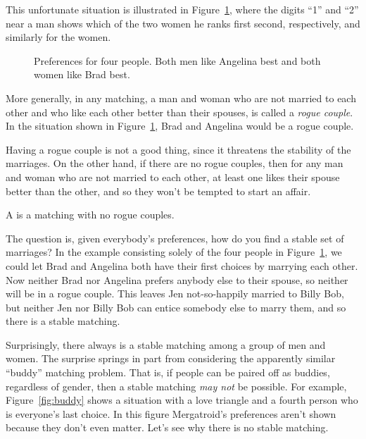 This unfortunate situation is illustrated in
Figure~\ref{fig:minWtMatch2}, where the digits ``1'' and ``2'' near a
man shows which of the two women he ranks first second, respectively,
and similarly for the women.

\begin{figure}


\caption{Preferences for four people.  Both men like Angelina best and
both women like Brad best.}
\label{fig:minWtMatch2}
\end{figure}

More generally, in any matching, a man and woman who are not married
to each other and who like each other better than their spouses, is
called a \emph{rogue couple}.  In the situation shown in
Figure~\ref{fig:minWtMatch2}, Brad and Angelina would be a rogue
couple.

Having a rogue couple is not a good thing, since it threatens the
stability of the marriages.  On the other hand, if there are no rogue
couples, then for any man and woman who are not married to each other,
at least one likes their spouse better than the other, and so they
won't be tempted to start an affair.

\begin{definition}
  A  is a matching with no rogue couples.
\end{definition}

The question is, given everybody's preferences, how do you find a
stable set of marriages?  In the example consisting solely of the four
people in Figure~\ref{fig:minWtMatch2}, we could let Brad and Angelina
both have their first choices by marrying each other.  Now neither
Brad nor Angelina prefers anybody else to their spouse, so neither
will be in a rogue couple.  This leaves Jen not-so-happily married to
Billy Bob, but neither Jen nor Billy Bob can entice somebody else to
marry them, and so there is a stable matching.

Surprisingly, there always is a stable matching among a group of men
and women.  The surprise springs in part from considering the
apparently similar ``buddy'' matching problem.  That is, if people can
be paired off as buddies, regardless of gender, then a stable matching
\emph{may not} be possible.  For example, Figure~\ref{fig:buddy} shows
a situation with a love triangle and a fourth person who is everyone's
last choice.  In this figure Mergatroid's preferences aren't shown
because they don't even matter.  Let's see why there is no stable
matching.

